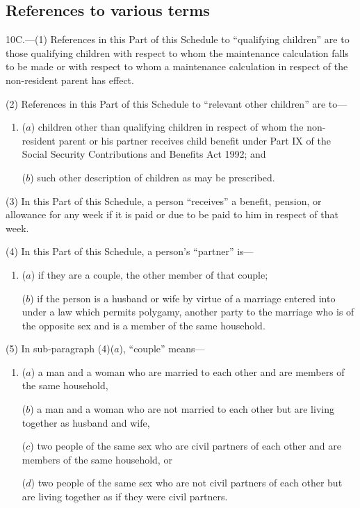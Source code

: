 \documentclass[12pt,a4paper]{article}
\begin{document}
{\subsection*{References to various terms}

10C.—(1) References in this Part of this Schedule to “qualifying children” are to those qualifying children with respect to whom the maintenance calculation falls to be made or with respect to whom a maintenance calculation in respect of the non-resident parent has effect.

(2) References in this Part of this Schedule to “relevant other children” are to---
\begin{enumerate}\item[]
($a$) children other than qualifying children in respect of whom the non-resident
parent or his partner receives child benefit under Part IX of the Social
Security Contributions and Benefits Act 1992; and

($b$) such other description of children as may be prescribed.
\end{enumerate}

(3) In this Part of this Schedule, a person “receives” a benefit, pension, or allowance for any week if it is paid or due to be paid to him in respect of that week.

(4) In this Part of this Schedule, a person’s “partner” is---
\begin{enumerate}\item[]
($a$) if they are a couple, the other member of that couple;

($b$) if the person is a husband or wife by virtue of a marriage entered into
under a law which permits polygamy, another party to the marriage who
is of the opposite sex and is a member of the same household.
\end{enumerate}

(5) In sub-paragraph (4)($a$), “couple” means---
\begin{enumerate}\item[]
($a$) a man and a woman who are married to each other and are members of
the same household,

($b$) a man and a woman who are not married to each other but are living
together as husband and wife,

($c$) two people of the same sex who are civil partners of each other and are
members of the same household, or

($d$) two people of the same sex who are not civil partners of each other but are
living together as if they were civil partners.
\end{enumerate}

}
\end{document}
